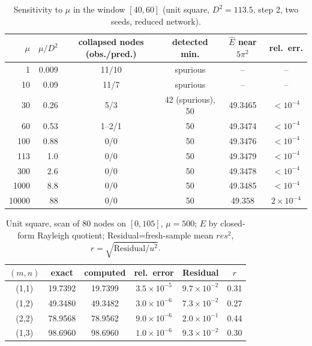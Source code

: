 \begin{table}[H]\centering\small
\begin{tabular}{rrcccc}
\toprule
$\mu$ & $\mu/D^2$ & collapsed nodes (obs./pred.) & detected min. & $\hat E$ near $5\pi^2$ & rel.\ err.\\
\midrule
1 & 0.009 & 11/10 & spurious & -- & --\\
10 & 0.09 & 11/7 & spurious & -- & --\\
30 & 0.26 & 5/3 & 42 (spurious), 50 & 49.3465 & $<10^{-4}$\\
60 & 0.53 & 1--2/1 & 50 & 49.3474 & $<10^{-4}$\\
100 & 0.88 & 0/0 & 50 & 49.3476 & $<10^{-4}$\\
113 & 1.0 & 0/0 & 50 & 49.3479 & $<10^{-4}$\\
300 & 2.6 & 0/0 & 50 & 49.3478 & $<10^{-4}$\\
1000 & 8.8 & 0/0 & 50 & 49.3485 & $<10^{-4}$\\
10000 & 88 & 0/0 & 50 & 49.358 & $2\times10^{-4}$\\
\bottomrule
\end{tabular}
\caption{Sensitivity to $\mu$ in the window $[40,60]$ (unit square, $D^2=113.5$, step 2, two seeds, reduced network).}
\end{table}

\begin{table}[H]\centering\small
\begin{tabular}{cccccc}
\toprule
$(m,n)$ & exact & computed & rel.\ error & Residual & $r$\\
\midrule
(1,1) & 19.7392 & 19.7399 & $3.5\times10^{-5}$ & $9.7\times10^{-2}$ & 0.31\\
(1,2) & 49.3480 & 49.3482 & $3.0\times10^{-6}$ & $7.3\times10^{-2}$ & 0.27\\
(2,2) & 78.9568 & 78.9562 & $9.0\times10^{-6}$ & $2.0\times10^{-1}$ & 0.44\\
(1,3) & 98.6960 & 98.6960 & $1.0\times10^{-6}$ & $9.3\times10^{-2}$ & 0.30\\
\bottomrule
\end{tabular}
\caption{Unit square, scan of 80 nodes on $[0,105]$, $\mu=500$; $E$ by closed-form Rayleigh quotient; Residual=fresh-sample mean $res^2$, $r=\sqrt{\text{Residual}/\overline{u^2}}$.}
\end{table}

